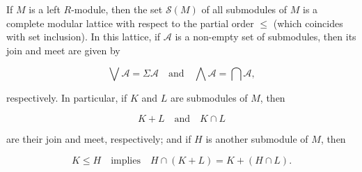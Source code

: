 If $M$ is a left $R$-module, then the set $\mathcal{S}(M)$ of all submodules of $M$ is a complete modular lattice with respect to the partial order $\leq$ (which coincides with set inclusion). In this lattice, if $\mathcal{A}$ is a non-empty set of submodules, then its join and meet are given by

$$\bigvee \mathcal{A} = \Sigma \mathcal{A} \quad \text{and} \quad \bigwedge \mathcal{A} = \bigcap \mathcal{A},$$

respectively. In particular, if $K$ and $L$ are submodules of $M$, then

$$K + L \quad \text{and} \quad K \cap L$$

are their join and meet, respectively; and if $H$ is another submodule of $M$, then

$$K \leq H \quad \text{implies} \quad H \cap (K + L) = K + (H \cap L).$$
